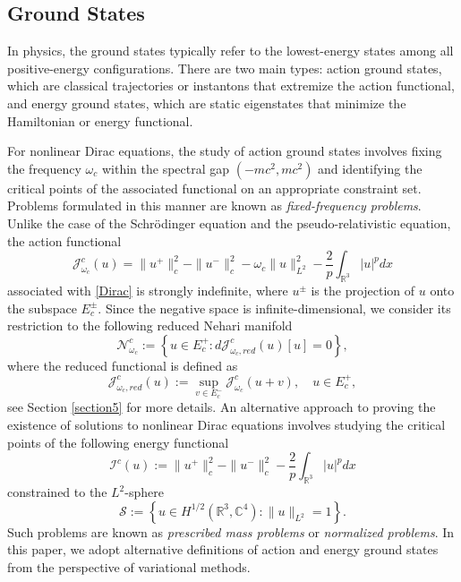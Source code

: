 \documentclass{amsart}
\theoremstyle{plain}
\theoremstyle{definition}
\theoremstyle{remark}
\numberwithin{equation}{section} \numberwithin{figure}{section}
\begin{document}
\subsection{Ground States}
In physics, the ground states typically refer to the lowest-energy states among all  positive-energy configurations. There are two main types: action ground states, which are classical trajectories or instantons that extremize the action functional, and energy ground states, which are static eigenstates that minimize the Hamiltonian or energy functional.

For nonlinear Dirac equations, the study of action ground states involves fixing the frequency  $\omega_c$ within the spectral gap $(-mc^2, mc^2)$ and identifying the critical points of the associated functional on an appropriate constraint set. Problems formulated in this manner are known as {\it fixed-frequency problems}. Unlike the case of the Schr\"odinger equation and the pseudo-relativistic equation, the action functional 
\[
\mathcal{J}_{\omega_c}^c(u)=\|u^+\|_c^2-\|u^-\|_c^2-\omega_c\|u\|_{L^2}^2
-\frac{2}{p}\int_{\mathbb{R}^3 } |u|^p dx
\]
associated with \eqref{Dirac} is strongly indefinite, where $u^\pm$ is the projection of $u$ 
onto the subspace $E_c^\pm$. Since the negative space is infinite-dimensional, we consider its restriction to the following  reduced Nehari manifold
\[\mathcal{N}_{\omega_c}^c:=\left\{ u\in E_c^+: d\mathcal{J}_{\omega_c,red}^c(u) [u]=0 \right\},\]
where the reduced functional is defined as
$$
\mathcal{J}_{\omega_c,red}^c(u):=
\sup_{v\in E_c^-}\mathcal{J}_{\omega_c}^c(u+v),\quad u\in E_c^+,
$$
see Section \ref{section5} for more details.
An alternative approach to proving the existence of solutions to nonlinear Dirac equations involves studying the critical points of the following energy functional
\[
\mathcal{I}^{c}(u) := \|u^+\|_c^2 - \|u^-\|_c^2 - \frac{2}{p} \int_{\mathbb{R}^3} |u|^p  dx 
\]  
constrained to the $L^2$-sphere  
\[
\mathcal{S} := \left\{ u \in H^{1/2}(\mathbb{R}^3,\mathbb{C}^4) : \|u\|_{L^2} = 1 \right\}.
\]  
Such problems are known as {\it prescribed mass problems} or {\it normalized problems}. 
In this paper, we adopt alternative definitions of action and energy ground states from the perspective of variational methods.
\end{document}
